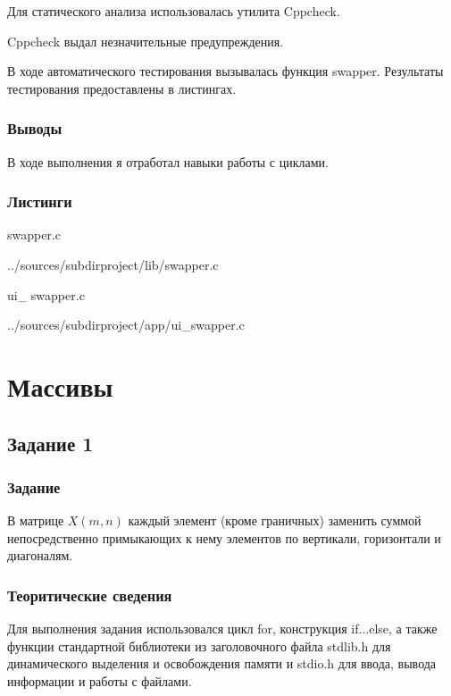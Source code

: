 \documentclass[12pt,a4paper]{report}
\begin{document}
	Для статического анализа использовалась утилита Cppcheck.
	
	\vspace{\baselineskip}
	 Cppcheck выдал незначительные предупреждения.
	
	

	\vspace{\baselineskip}
	
	В ходе автоматического тестирования  вызывалась функция swapper. Результаты тестирования предоставлены в листингах.
	 \vspace{\baselineskip}
 

\subsection{Выводы}
В ходе выполнения я отработал навыки работы с циклами.
\subsection*{Листинги}
swapper.c

{../sources/subdirproject/lib/swapper.c}

\vspace{\baselineskip}

ui\_ swapper.c

{../sources/subdirproject/app/ui_swapper.c}


\chapter{Массивы}
\section{Задание 1}
\subsection{Задание}

В матрице $X(m,n)$ каждый элемент (кроме граничных) заменить суммой непосредственно примыкающих к нему элементов по вертикали, горизонтали и диагоналям.

\subsection{Теоритические сведения}

Для выполнения задания использовался цикл for, конструкция if...else, а также функции стандартной библиотеки из заголовочного файла stdlib.h для динамического выделения и освобождения памяти и stdio.h для ввода, вывода информации и работы с файлами.
\end{document}
